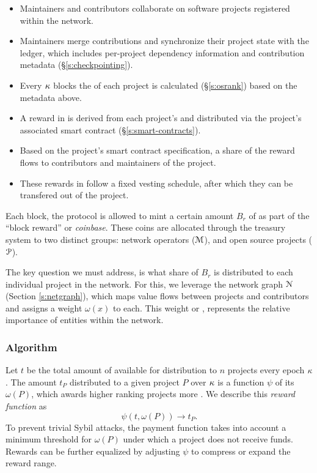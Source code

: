 \begin{itemize}
    \item Maintainers and contributors collaborate on software projects
        registered within the network.
    \item Maintainers merge contributions and synchronize their project state
        with the ledger, which includes per-project dependency information and
        contribution metadata (\S\ref{s:checkpointing}).
    \item Every $\kappa$ blocks the \osrank{} of each project is calculated
        (\S\ref{s:osrank}) based on the metadata above.
    \item A reward in \oscoin{} is derived from each project's \osrank{}
        and distributed via the project's associated smart contract (\S\ref{s:smart-contracts}).
    \item Based on the project's smart contract specification, a share of the reward flows
        to contributors and maintainers of the project.
    \item These rewards in \oscoin{} follow a fixed vesting schedule, after which
        they can be transfered out of the project.
\end{itemize}

\medskip

\noindent Each block, the protocol is allowed to mint a certain amount $B_r$ of \oscoin{}
as part of the ``block reward'' or \emph{coinbase}.
These coins are allocated through the treasury system to two distinct groups: network
operators ($\mathcal{M}$), and open source projects ($\mathcal{P}$).

The key question we must address, is what share of $B_r$ is distributed to
each individual project in the network.
For this, we leverage the \oscoin{} network graph $\mathcal{N}$ (Section
\ref{s:netgraph}), which maps value flows between projects and contributors
and assigns a weight $\omega(x)$ to each. This weight or \osrank{}, represents
the relative importance of entities within the network.

\subsubsection{Algorithm} Let $t$ be the total amount of \oscoin{} available for
distribution to $n$ projects every epoch $\kappa$. The amount $t_P$ distributed to a given
project $P$ over $\kappa$ is a function $\psi$ of its \osrank{} $\omega(P)$,
which awards higher ranking projects more \oscoin{}. We describe this
\emph{reward function} as
\[
    \psi(t, \omega(P)) \to t_P.
\]
To prevent trivial Sybil attacks, the payment function takes
into account a minimum threshold for $\omega(P)$ under which a project does not
receive funds. Rewards can be further equalized by adjusting $\psi$ to
compress or expand the reward range.

